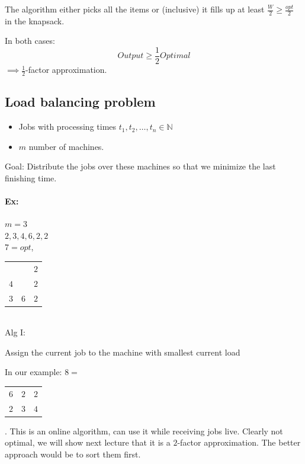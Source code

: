 \documentclass[12 pt]{article}
\begin{document}
          The algorithm either picks all the items or (inclusive) it
          fills up at least $\frac{W}{2} \geq \frac{opt}{2}$ in the knapsack.

          In both cases:
          $$Output \geq \frac{1}{2}Optimal$$
          $\implies \frac{1}{2}$-factor approximation.
          \subsection{Load balancing problem}
          \begin{itemize}
          \item Jobs with processing times $t_1,t_2,\ldots,t_n \in
            \mathbb{N}$
          \item $m$ number of machines.
          \end{itemize}
          Goal: Distribute the jobs over these machines so that we
          minimize the last finishing time.
          \paragraph{Ex:} $m=3$
          \\ $2,3,4,6,2,2$
          \\ $7 = opt$,
          \begin{tabular}{|l |l |l|}
            \hline &&$2$
            \\ $4$ & & $2$
            \\ $3$ & $6$ & $2$
            \\ \hline
          \end{tabular}\\
          Alg I:
          \begin{algorithmic}
                \State Assign the current job to the machine with
                smallest current load
            \EndWhile
          \end{algorithmic}
          In our example: $ 8 = $
          \begin{tabular}{|l|l|l|}
            \hline $6$& $2$& $2$
            \\ $2$ & $3$ & $4$
            \\ \hline
          \end{tabular}. This is an online algorithm, can use it
          while receiving jobs live. Clearly not optimal, we
          will show next lecture that it is a $2$-factor
          approximation. The better approach would be to sort
          them first.
\end{document}
